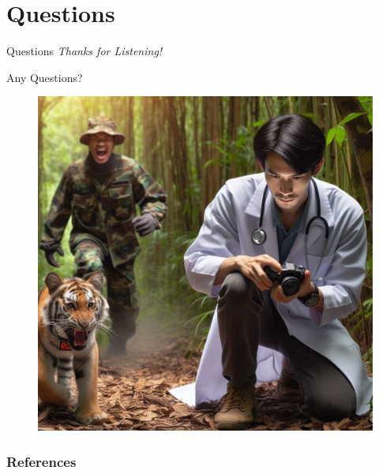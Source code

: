 \documentclass{beamer}
\begin{document}
\section{Questions}

\begin{frame}{Questions}
  \centering \Large
  \emph{Thanks for Listening!}

  Any Questions?

  \begin{figure}[htbp]
    \centering
    \includegraphics[height=.6\textheight]{Biologging_scenario.jpg}
    \label{fig:Biologging_scenario_return}
  \end{figure}
\end{frame}

\begin{frame}[allowframebreaks]
  \frametitle{References}
  \printbibliography
\end{frame}
\end{document}
